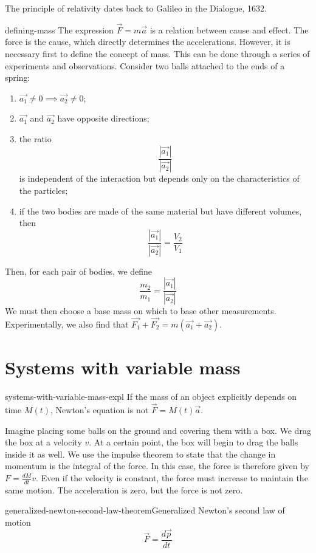 \documentclass[preview]{standalone}
\begin{document}
\begin{plainhtml}
    The principle of relativity dates back to Galileo in the Dialogue, 1632.
\end{plainhtml}

\begin{snippet}{defining-mass}
    The expression \(\vec{F} = m\vec{a}\) is a relation between cause and effect. The force is the cause, which directly determines the accelerations.
    However, it is necessary first to define the concept of mass. This can be done through a series of experiments and observations. Consider two balls attached to the ends of a spring:
    \begin{enumerate}
        \item \(\vec{a_1} \neq 0 \implies \vec{a_2} \neq 0\);
        \item \(\vec{a_1}\) and \(\vec{a_2}\) have opposite directions;
        \item the ratio 
        \[
            \frac{|\vec{a_1}|}{|\vec{a_2}|}
        \]
        is independent of the interaction but depends only on the characteristics of the particles;
        \item if the two bodies are made of the same material but have different volumes, then
        \[
            \frac{|\vec{a_1}|}{|\vec{a_2}|} = \frac{V_2}{V_1}
        \]
    \end{enumerate}
    Then, for each pair of bodies, we define
    \[
        \frac{m_2}{m_1} = \frac{|\vec{a_1}|}{|\vec{a_2}|}
    \]
    We must then choose a base mass on which to base other measurements. Experimentally, we also find that \(\vec{F_1} + \vec{F_2} = m(\vec{a_1} + \vec{a_2})\).
\end{snippet}

\section{Systems with variable mass}

\begin{snippet}{systems-with-variable-mass-expl}
    If the mass of an object explicitly depends on time \(M(t)\),
    Newton's equation is not \(\vec{F} = M(t) \vec{a}\).

    Imagine placing some balls on the ground and covering them with a box.
    We drag the box at a velocity \(v\). At a certain point, the box will begin to drag
    the balls inside it as well.
    We use the impulse theorem to state that the change in momentum is the integral
    of the force.
    In this case, the force is therefore given by \(F = \frac{dM}{dt} v\). Even if the velocity is constant,
    the force must increase to maintain the same motion.
    The acceleration is zero, but the force is not zero.
\end{snippet}

\begin{snippettheorem}{generalized-newton-second-law-theorem}{Generalized Newton's second law of motion}
    \[
        \vec{F} = \frac{d\vec{p}}{dt}
    \]
\end{snippettheorem}
\end{document}
